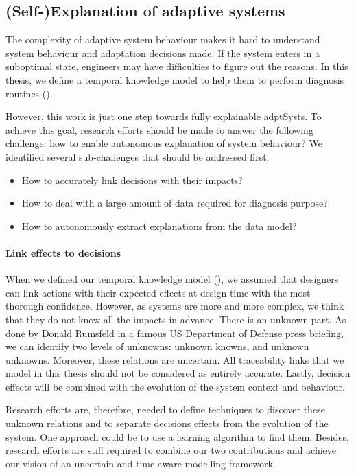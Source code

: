 \subsection{(Self-)Explanation of adaptive systems}

The complexity of adaptive system behaviour makes it hard to understand system behaviour and adaptation decisions made.
If the system enters in a suboptimal state, engineers may have difficulties to figure out the reasons.
In this thesis, we define a  temporal knowledge model to help them to perform diagnosis routines (\cf {}).

However, this work is just one step towards fully explainable \glspl{adptSyst}.
To achieve this goal, research efforts should be made to answer the following challenge: how to enable autonomous explanation of system behaviour?
We identified several sub-challenges that should be addressed first:
\begin{itemize}
	\item How to accurately link decisions with their impacts?
	\item How to deal with a large amount of data required for diagnosis purpose?
	\item How to autonomously extract explanations from the data model?
\end{itemize}

\paragraph{Link effects to decisions}
When we defined our temporal knowledge model (\cf {}), we assumed that designers can link \glspl{action} with their expected effects at design time with the most thorough confidence. 
However, as systems are more and more complex, we think that they do not know all the impacts in advance.
There is an unknown part.
As done by Donald Rumsfeld in a famous US Department of Defense press briefing, we can identify two levels of unknowns: unknown knowns, and unknown unknowns.
Moreover, these relations are uncertain.
All traceability links that we model in this thesis should not be considered as entirely accurate.
Lastly, decision effects will be combined with the evolution of the system context and behaviour.

Research efforts are, therefore, needed to define techniques to discover these unknown relations and to separate decisions effects from the evolution of the system.
One approach could be to use a learning algorithm to find them.
Besides, research efforts are still required to combine our two contributions and achieve our vision of an uncertain and time-aware modelling framework.

